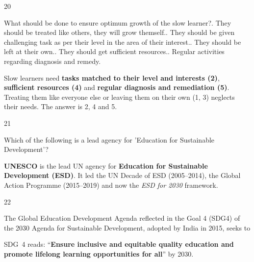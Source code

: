 \begin{question}{20}
{What should be done to ensure optimum growth of the slow learner?. They should be treated like others, they will grow themself.. They should be given challenging task as per their level in the area of their interest.. They should be left at their own.. They should get sufficient resources.. Regular activities regarding diagnosis and remedy.\par}
\begin{explain}
Slow learners need \textbf{tasks matched to their level and interests (2)}, \textbf{sufficient resources (4)} and \textbf{regular diagnosis and remediation (5)}. Treating them like everyone else or leaving them on their own (1, 3) neglects their needs. The answer is 2, 4 and 5.
\end{explain}
\end{question}

\begin{question}{21}
{Which of the following is a lead agency for 'Education for Sustainable Development'?\par}
\begin{explain}
\textbf{UNESCO} is the lead UN agency for \textbf{Education for Sustainable Development (ESD)}. It led the UN Decade of ESD (2005--2014), the Global Action Programme (2015--2019) and now the \emph{ESD for 2030} framework.
\end{explain}
\end{question}

\begin{question}{22}
{The Global Education Development Agenda reflected in the Goal 4 (SDG4) of the 2030 Agenda for Sustainable Development, adopted by India in 2015, seeks to\par}
\begin{explain}
SDG~4 reads: ``\textbf{Ensure inclusive and equitable quality education and promote lifelong learning opportunities for all}'' by 2030.
\end{explain}
\end{question}

